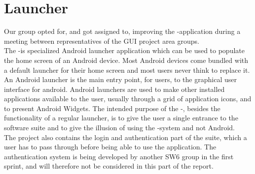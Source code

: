 
\section{Launcher}

Our group opted for, and got assigned to, improving the \giraf-\launcher application during a meeting between representatives of the GUI project area groups.\\

The \giraf-\launcher is specialized Android launcher application which can be used to populate the home screen of an Android device. Most Android devices come bundled with a default launcher for their home screen and most users never think to replace it. An Android launcher is the main entry point, for users, to the graphical user interface for android. Android launchers are used to make other installed applications available to the user, usually through a grid of application icons, and to present Android Widgets. The intended purpose of the \giraf-\launcher, besides the functionality of a regular launcher, is to give the user a single entrance to the \giraf software suite and to give the illusion of using the \giraf-system and not Android.\\

The \launcher project also contains the login and authentication part of the \giraf suite, which a user has to pass through before being able to use the application. The authentication system is being developed by another SW6 group in the first sprint, and will therefore not be considered in this part of the report. 